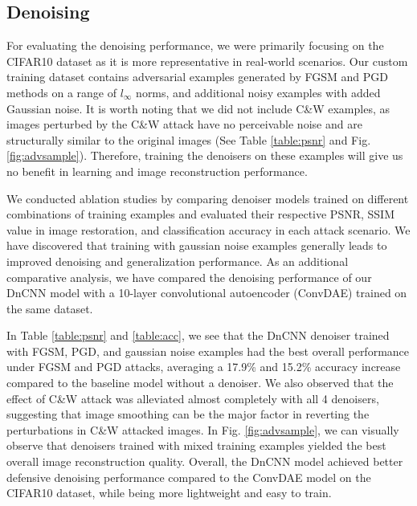 \documentclass[10pt,journal,compsoc]{IEEEtran}
\begin{document}
\subsection{Denoising}
For evaluating the denoising performance, we were primarily focusing on the CIFAR10 dataset as it is more representative in real-world scenarios. Our custom training dataset contains adversarial examples generated by FGSM and PGD methods on a range of $l_{\infty}$ norms, and additional noisy examples with added Gaussian noise. It is worth noting that we did not include C\&W examples, as images perturbed by the C\&W attack have no perceivable noise and are structurally similar to the original images (See Table \ref{table:psnr} and Fig. \ref{fig:advsample}). Therefore, training the denoisers on these examples will give us no benefit in learning and image reconstruction performance. 

We conducted ablation studies by comparing denoiser models trained on different combinations of training examples and evaluated their respective PSNR, SSIM value in image restoration, and classification accuracy in each attack scenario. We have discovered that training with gaussian noise examples generally leads to improved denoising and generalization performance. As an additional comparative analysis, we have compared the denoising performance of our DnCNN model with a 10-layer convolutional autoencoder (ConvDAE) \cite{rednet} trained on the same dataset.

In Table \ref{table:psnr} and \ref{table:acc}, we see that the DnCNN denoiser trained with FGSM, PGD, and gaussian noise examples had the best overall performance under FGSM and PGD attacks, averaging a 17.9\% and 15.2\% accuracy increase compared to the baseline model without a denoiser. We also observed that the effect of C\&W attack was alleviated almost completely with all 4 denoisers, suggesting that image smoothing can be the major factor in reverting the perturbations in C\&W attacked images. In Fig. \ref{fig:advsample}, we can visually observe that denoisers trained with mixed training examples yielded the best overall image reconstruction quality. Overall, the DnCNN model achieved better defensive denoising performance compared to the ConvDAE model on the CIFAR10 dataset, while being more lightweight and easy to train.
\end{document}
